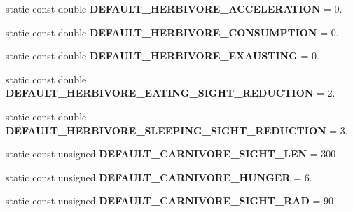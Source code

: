 \begin{DoxyCompactItemize}
\item 
\hypertarget{class_constants_a29531185e266ce9d0e7d7522ed1610bb}{}static const double {\bfseries D\+E\+F\+A\+U\+L\+T\+\_\+\+H\+E\+R\+B\+I\+V\+O\+R\+E\+\_\+\+A\+C\+C\+E\+L\+E\+R\+A\+T\+I\+O\+N} = 0.\label{class_constants_a29531185e266ce9d0e7d7522ed1610bb}

\item 
\hypertarget{class_constants_a9c9548a03d705b83b71cd28783b14616}{}static const double {\bfseries D\+E\+F\+A\+U\+L\+T\+\_\+\+H\+E\+R\+B\+I\+V\+O\+R\+E\+\_\+\+C\+O\+N\+S\+U\+M\+P\+T\+I\+O\+N} = 0.\label{class_constants_a9c9548a03d705b83b71cd28783b14616}

\item 
\hypertarget{class_constants_a8ef01fd06ebf067c61d9119d9ff37cc6}{}static const double {\bfseries D\+E\+F\+A\+U\+L\+T\+\_\+\+H\+E\+R\+B\+I\+V\+O\+R\+E\+\_\+\+E\+X\+A\+U\+S\+T\+I\+N\+G} = 0.\label{class_constants_a8ef01fd06ebf067c61d9119d9ff37cc6}

\item 
\hypertarget{class_constants_ac5660d3f2aa5ce0c8322afc71af9db0e}{}static const double {\bfseries D\+E\+F\+A\+U\+L\+T\+\_\+\+H\+E\+R\+B\+I\+V\+O\+R\+E\+\_\+\+E\+A\+T\+I\+N\+G\+\_\+\+S\+I\+G\+H\+T\+\_\+\+R\+E\+D\+U\+C\+T\+I\+O\+N} = 2.\label{class_constants_ac5660d3f2aa5ce0c8322afc71af9db0e}

\item 
\hypertarget{class_constants_aaae7d33e72454d80c2f37f03b2467c70}{}static const double {\bfseries D\+E\+F\+A\+U\+L\+T\+\_\+\+H\+E\+R\+B\+I\+V\+O\+R\+E\+\_\+\+S\+L\+E\+E\+P\+I\+N\+G\+\_\+\+S\+I\+G\+H\+T\+\_\+\+R\+E\+D\+U\+C\+T\+I\+O\+N} = 3.\label{class_constants_aaae7d33e72454d80c2f37f03b2467c70}

\item 
\hypertarget{class_constants_aa536a64fb80212812f242cc408a171fd}{}static const unsigned {\bfseries D\+E\+F\+A\+U\+L\+T\+\_\+\+C\+A\+R\+N\+I\+V\+O\+R\+E\+\_\+\+S\+I\+G\+H\+T\+\_\+\+L\+E\+N} = 300\label{class_constants_aa536a64fb80212812f242cc408a171fd}

\item 
\hypertarget{class_constants_af6d728e4d08c0ceb6c913834c7b2654b}{}static const unsigned {\bfseries D\+E\+F\+A\+U\+L\+T\+\_\+\+C\+A\+R\+N\+I\+V\+O\+R\+E\+\_\+\+H\+U\+N\+G\+E\+R} = 6.\label{class_constants_af6d728e4d08c0ceb6c913834c7b2654b}

\item 
\hypertarget{class_constants_a9fc6a5b810d0eac8a2b0881df276d15f}{}static const unsigned {\bfseries D\+E\+F\+A\+U\+L\+T\+\_\+\+C\+A\+R\+N\+I\+V\+O\+R\+E\+\_\+\+S\+I\+G\+H\+T\+\_\+\+R\+A\+D} = 90\label{class_constants_a9fc6a5b810d0eac8a2b0881df276d15f}


\end{DoxyCompactItemize}
